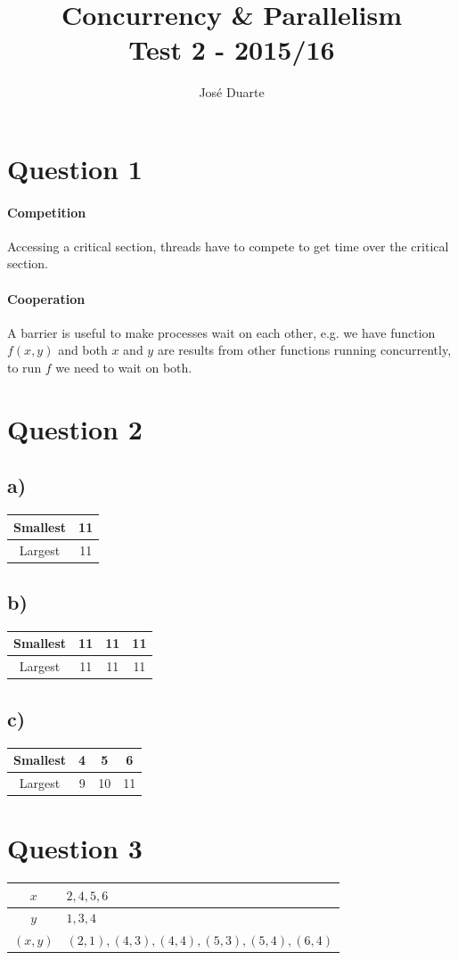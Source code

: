 \documentclass[a4paper,twocolumn]{article}
\author{José Duarte}
\title{Concurrency \& Parallelism\\Test 2 - 2015/16}
\begin{document}
\maketitle
\section{Question 1}
\paragraph{Competition}
Accessing a critical section, threads have to compete to get time over the critical section.
\paragraph{Cooperation}
A barrier is useful to make processes wait on each other,
e.g. we have function $f(x, y)$ and both $x$ and $y$ are results from other functions running concurrently,
to run $f$ we need to wait on both.
\section{Question 2}
\subsection{a)}
\begin{tabular}{c|c}
    Smallest & 11 \\
    \hline
    Largest  & 11 \\
\end{tabular}
\subsection{b)}
\begin{tabular}{c|c c c}
    Smallest & 11 & 11 & 11 \\
    \hline
    Largest  & 11 & 11 & 11 \\
\end{tabular}
\subsection{c)}
\begin{tabular}{c|c c c}
    Smallest & 4 & 5 & 6 \\
    \hline
    Largest  & 9 & 10 & 11\\
\end{tabular}
\section{Question 3}
\begin{tabular}{c | l}
    $x$ & $2, 4, 5, 6$ \\
    \hline
    $y$ & $1, 3, 4$ \\
    \hline
    $(x, y)$ & $(2, 1), (4, 3), (4, 4), (5, 3), (5, 4), (6, 4)$ \\
\end{tabular}
\end{document}
